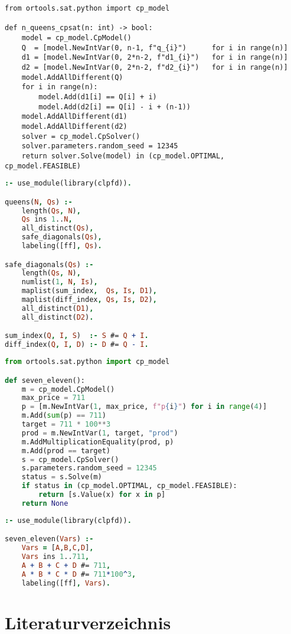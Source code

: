 \documentclass[12pt,a4paper]{article}
\begin{document}
\begin{lstlisting}[caption={N-Queens in CP-SAT -- Modellierung und Lösung},label={lst:nqueens-model}]
from ortools.sat.python import cp_model

def n_queens_cpsat(n: int) -> bool:
    model = cp_model.CpModel()
    Q  = [model.NewIntVar(0, n-1, f"q_{i}")      for i in range(n)]
    d1 = [model.NewIntVar(0, 2*n-2, f"d1_{i}")   for i in range(n)]
    d2 = [model.NewIntVar(0, 2*n-2, f"d2_{i}")   for i in range(n)]
    model.AddAllDifferent(Q)
    for i in range(n):
        model.Add(d1[i] == Q[i] + i)
        model.Add(d2[i] == Q[i] - i + (n-1))
    model.AddAllDifferent(d1)
    model.AddAllDifferent(d2)
    solver = cp_model.CpSolver()
    solver.parameters.random_seed = 12345
    return solver.Solve(model) in (cp_model.OPTIMAL, cp_model.FEASIBLE)
\end{lstlisting}

\begin{lstlisting}[language=Prolog,
  caption={N-Queens in CLP(FD) -- Modellierung und Lösung},
  label={lst:nqueens-clpfd}]
:- use_module(library(clpfd)).

queens(N, Qs) :-
    length(Qs, N),
    Qs ins 1..N,
    all_distinct(Qs),
    safe_diagonals(Qs),
    labeling([ff], Qs).

safe_diagonals(Qs) :-
    length(Qs, N),
    numlist(1, N, Is),
    maplist(sum_index,  Qs, Is, D1),
    maplist(diff_index, Qs, Is, D2),
    all_distinct(D1),
    all_distinct(D2).

sum_index(Q, I, S)  :- S #= Q + I.
diff_index(Q, I, D) :- D #= Q - I.
\end{lstlisting}

\begin{lstlisting}[language=Python,
  caption={7--11 in CP-SAT -- Modellierung und Lösung},
  label={lst:seven-eleven-cpsat}]
from ortools.sat.python import cp_model

def seven_eleven():
    m = cp_model.CpModel()
    max_price = 711
    p = [m.NewIntVar(1, max_price, f"p{i}") for i in range(4)]
    m.Add(sum(p) == 711)
    target = 711 * 100**3
    prod = m.NewIntVar(1, target, "prod")
    m.AddMultiplicationEquality(prod, p)
    m.Add(prod == target)
    s = cp_model.CpSolver()
    s.parameters.random_seed = 12345
    status = s.Solve(m)
    if status in (cp_model.OPTIMAL, cp_model.FEASIBLE):
        return [s.Value(x) for x in p]
    return None
\end{lstlisting}

\begin{lstlisting}[language=Prolog,
  caption={7--11 in CLP(FD) -- Modellierung und Lösung},
  label={lst:seven-eleven-clpfd}]
:- use_module(library(clpfd)).

seven_eleven(Vars) :-
    Vars = [A,B,C,D],
    Vars ins 1..711,
    A + B + C + D #= 711,
    A * B * C * D #= 711*100^3,
    labeling([ff], Vars).
\end{lstlisting}



\section{Literaturverzeichnis}
\renewcommand*{\bibname}{} %
\renewcommand*{\refname}{} %
\printbibliography
\end{document}
